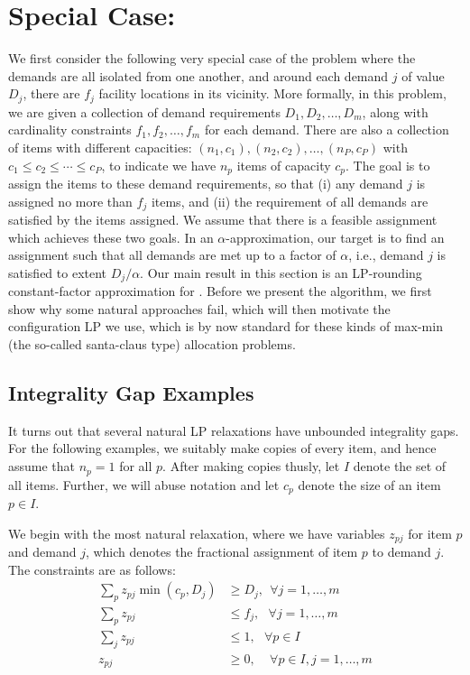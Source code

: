 \newcommand{\barcalS}{\bar{\cal S}\xspace}
\newcommand{\brt}{{(t)}}

\section{Special Case: \cckp}
We first consider the following very special case of the \mckc problem where the demands are all isolated from one another, and around each demand $j$ of value $D_j$, there are $f_j$ facility locations in its vicinity. More formally, in this problem, we are given a collection of demand requirements $D_1, D_2, \ldots, D_m$, along with cardinality constraints $f_1, f_2, \ldots, f_m$ for each demand. There are also a collection of items with different capacities: $(n_1,c_1), (n_2,c_2),\ldots, (n_P,c_P)$ with $c_1 \leq c_2 \le \cdots \le c_P$,
to indicate we have $n_p$ items of capacity $c_p$. The goal is to assign the items to these demand requirements, so that (i) any demand $j$ is assigned no more than $f_j$ items, and (ii) the requirement of all demands are satisfied by the items assigned. We assume that there is a feasible assignment which achieves these two goals. In an $\alpha$-approximation, our target is to find an assignment such that all demands are met up to a factor of $\alpha$, i.e., demand $j$ is satisfied to extent $D_j/\alpha$.
Our main result in this section is an LP-rounding constant-factor approximation for \cckp. Before we present the algorithm, we first show why some natural approaches fail, which will then motivate the configuration LP we use, which is by now standard for these kinds of max-min (the so-called santa-claus type) allocation problems.

\subsection{Integrality Gap Examples}
It turns out that several natural LP relaxations have unbounded integrality gaps. For the following examples, we suitably make copies of every item, and hence assume that $n_p = 1$ for all $p$. After making copies thusly, let $I$ denote the set of all items. Further, we will abuse notation and let $c_p$ denote the
size of an item $p \in I$.

We begin with the most natural relaxation, where we have variables $z_{pj}$ for item $p$ and demand $j$, which denotes the fractional assignment of item $p$ to demand $j$. The constraints are as follows:
\begin{align*}
\sum_{p} z_{pj} \min(c_p, D_j) & \geq D_j, \ \  \forall j=1, \ldots, m \\
\sum_p z_{pj} & \leq f_j, \ \ \ \forall j = 1, \ldots, m \\
\sum_j z_{pj} & \leq 1,  \ \ \ \forall p \in I \\
z_{pj} & \geq 0, \ \ \ \ \ \forall p \in I, j = 1, \ldots, m
\end{align*}

